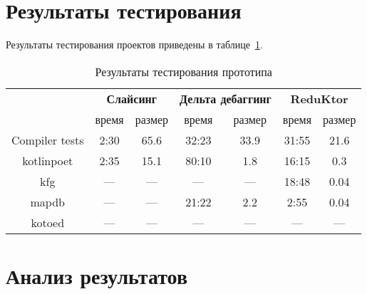 \section{Результаты тестирования}
Результаты тестирования проектов приведены в таблице~\ref{tab:testing}.
\begin{table}[]
\center
\caption{\label{tab:testing}Результаты тестирования прототипа}
\begin{tabular}{| c | c | c | c | c | c | c |}
\hline
\bf \multirow{2}{*}{Проект} & \multicolumn{2}{|c|}{\bf Слайсинг} & \multicolumn{2}{|c|}{\bf Дельта дебаггинг}  & \multicolumn{2}{|c|}{\bf ReduKtor} \\
\cline{2-7}
& время & размер & время & размер & время & размер \\
\hline
Compiler tests & 2:30 & 65.6 & 32:23 & 33.9 & 31:55 & 21.6 \\
\hline
kotlinpoet & 2:35 & 15.1 & 80:10 & 1.8 & 16:15 & 0.3 \\
\hline
kfg & --- & --- & --- & --- & 18:48 & 0.04 \\
\hline
mapdb & --- & --- & 21:22 & 2.2 & 2:55 & 0.04 \\
\hline
kotoed & --- & --- & --- & --- & --- & --- \\
\hline
\end{tabular}
\end{table}
\section{Анализ результатов}